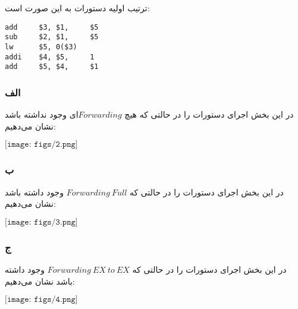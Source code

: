 ترتیب اولیه دستورات به این صورت است:

\setLTR
\begin{lstlisting}
add     $3, $1,     $5
sub     $2, $1,     $5
lw      $5, 0($3)
addi    $4, $5,     1
add     $5, $4,     $1
\end{lstlisting}
\setRTL

\subsubsection*{الف}
در این بخش اجرای دستورات را در حالتی که هیچ  
$Forwarding$ای وجود نداشته باشد نشان می‌دهیم:

\setLTR

$\texttt{[image: figs/2.png]}$

\setRTL

\subsubsection*{ب}

در این بخش اجرای دستورات را در حالتی که 
$Forwarding \ Full$
وجود داشته باشد نشان می‌دهیم:

\setLTR

$\texttt{[image: figs/3.png]}$

\setRTL

\subsubsection*{ج}

در این بخش اجرای دستورات را در حالتی که 
$Forwarding \ EX  \ to \ EX$
وجود داشته باشد نشان می‌دهیم:

\setLTR

$\texttt{[image: figs/4.png]}$

\setRTL







